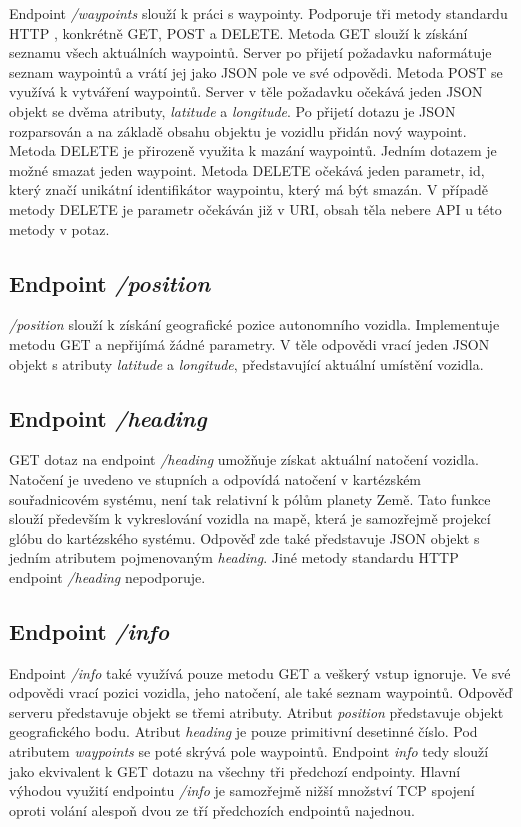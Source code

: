 \documentclass[czech, bachelor]{diploma}
\begin{document}
Endpoint \emph{/waypoints} slouží k práci s waypointy. Podporuje tři metody standardu HTTP \cite{http-source}, konkrétně GET, POST
a DELETE.  Metoda GET slouží k získání seznamu všech aktuálních waypointů. Server po přijetí požadavku naformátuje seznam
waypointů a vrátí jej jako JSON pole ve své odpovědi. Metoda POST se využívá k vytváření waypointů. Server v těle požadavku
očekává jeden JSON objekt se dvěma atributy, \emph{latitude} a \emph{longitude}. Po přijetí dotazu je JSON rozparsován a
na základě obsahu objektu je vozidlu přidán nový waypoint. Metoda DELETE je přirozeně využita k mazání waypointů. Jedním dotazem
je možné smazat jeden waypoint. Metoda DELETE očekává jeden parametr, id, který značí unikátní identifikátor waypointu, který má
být smazán. V případě metody DELETE je parametr očekáván již v URI, obsah těla nebere API u této metody v potaz.

\subsection{Endpoint \emph{/position}}

\emph{/position} slouží k získání geografické pozice autonomního vozidla. Implementuje metodu GET a nepřijímá žádné parametry.
V těle odpovědi vrací jeden JSON objekt s atributy \emph{latitude} a \emph{longitude}, představující aktuální umístění vozidla.

\subsection{Endpoint \emph{/heading}}

GET dotaz na endpoint \emph{/heading} umožňuje získat aktuální natočení vozidla. Natočení je uvedeno ve stupních a odpovídá
natočení v kartézském souřadnicovém systému, není tak relativní k pólům planety Země. Tato funkce slouží především k vykreslování
vozidla na mapě, která je samozřejmě projekcí glóbu do kartézského systému. Odpověď zde také představuje JSON objekt s jedním
atributem pojmenovaným \emph{heading}. Jiné metody standardu HTTP endpoint \emph{/heading} nepodporuje.

\subsection{Endpoint \emph{/info}}

Endpoint \emph{/info} také využívá pouze metodu GET a veškerý vstup ignoruje. Ve své odpovědi vrací pozici vozidla, jeho
natočení, ale také seznam waypointů.  Odpověď serveru představuje objekt se třemi atributy. Atribut \emph{position} představuje
objekt geografického bodu. Atribut \emph{heading} je pouze primitivní desetinné číslo. Pod atributem \emph{waypoints} se poté
skrývá pole waypointů. Endpoint \emph{info} tedy slouží jako ekvivalent k GET dotazu na všechny tři předchozí endpointy. Hlavní
výhodou využití endpointu \emph{/info} je samozřejmě nižší množství TCP spojení oproti volání alespoň dvou ze tří předchozích
endpointů najednou. 
\end{document}
